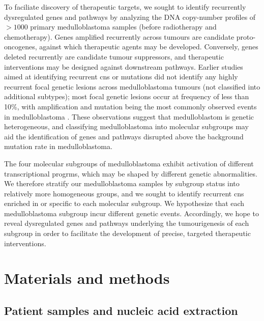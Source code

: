 To faciliate discovery of therapeutic targets, we sought to identify recurrently dysregulated genes and pathways by analyzing the DNA copy-number profiles of $> 1000$ primary medulloblastoma samples (before radiotherapy and chemotherapy). Genes amplified recurrently across tumours are candidate proto-oncogenes, against which therapeutic agents may be developed. Conversely, genes deleted recurrently are candidate tumour suppressors, and therapeutic interventions may be designed against downstream pathways. Earlier studies aimed at identifying recurrent \gls{cns} or mutations did not identify any highly recurrent focal genetic lesions across medulloblastoma tumours (not classified into additional subtypes); most focal genetic lesions occur at frequency of less than 10\%, with  amplification and  mutation being the most commonly observed events in medulloblastoma . These observations suggest that medulloblastom is genetic heterogeneous, and classifying medulloblastoma into molecular subgroups may aid the identification of genes and pathways disrupted above the background mutation rate in medulloblastoma.

The four molecular subgroups of medulloblastoma exhibit activation of different transcriptional progrms, which may be shaped by different genetic abnormalities. We therefore stratify our medulloblastoma samples by subgroup status into relatively more homogeneous groups, and we sought to identify recurrent \gls{cns} enriched in or specific to each molecular subgroup. We hypothesize that each medulloblastoma subgroup incur different genetic events. Accordingly, we hope to reveal dysregulated genes and pathways underlying the tumourigenesis of each subgroup in order to facilitate the development of precise, targeted therapeutic interventions.




\section{Materials and methods}

\subsection{Patient samples and nucleic acid extraction}

